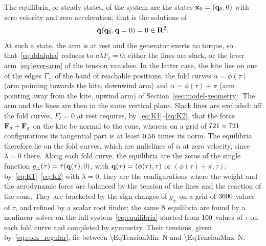 The equilibria, or steady states, of the system are the states \(\vb x_0 = (\vb q_0, 0)\) with zero velocity and zero acceleration, that is the solutions of
\begin{equation} \label{eq:equilibria}
    \ddot{\vb q}(\vb q_0, \dot{\vb q} = 0) = 0 \in \mathbf{R}^2.
\end{equation}
At such a state, the arm is at rest and the generator exerts no torque, so that~\eqref{eq:ddalpha} reduces to \(a\lambda F_\ell = 0\): either the lines are slack, or the lever arm~\eqref{eq:lever-arm} of the tension vanishes.
In the latter case, the kite lies on one of the edges \(\Gamma_\pm\) of the band of reachable positions, the fold curves \(\alpha = \phi(\tau)\) (arm pointing towards the kite, downwind arm) and \(\alpha = \phi(\tau) + \pi\) (arm pointing away from the kite, upwind arm) of Section~\ref{sec:model-geometry}.
The arm and the lines are then in the same vertical plane.
Slack lines are excluded: off the fold curves, \(F_\ell = 0\) at rest requires, by~\eqref{eq:K1}--\eqref{eq:K2}, that the force \(\vb F_a + \vb F_g\) on the kite be normal to the cone, whereas on a grid of \(721\times721\) configurations its tangential part is at least \(0.56\) times its norm.
The equilibria therefore lie on the fold curves, which are nullclines of \(\ddot\alpha\) at zero velocity, since \(\lambda = 0\) there.
Along each fold curve, the equilibria are the zeros of the single function \(g_\pm(\tau) = \ddot\tau(\vb q(\tau), 0)\), with \(\vb q(\tau) = (\phi(\tau), \tau)\) or \((\phi(\tau)+\pi, \tau)\); by~\eqref{eq:K1}--\eqref{eq:K2} with \(\lambda = 0\), they are the configurations where the weight and the aerodynamic force are balanced by the tension of the lines and the reaction of the cone.
They are bracketed by the sign changes of \(g_\pm\) on a grid of \(3600\) values of \(\tau\), and refined by a scalar root finder; the same \(8\) equilibria are found by a nonlinear solver on the full system~\eqref{eq:equilibria} started from \(100\) values of \(\tau\) on each fold curve and completed by symmetry.
Their tensions, given by~\eqref{eq:eom_regular}, lie between \SI{\EqTensionMin}{\newton} and \SI{\EqTensionMax}{\newton}.

